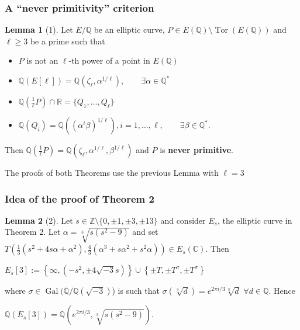 \documentclass[12pt,handout]{beamer} %
\newcommand{\Q}{\mathbb Q}
\newcommand{\Z}{\mathbb Z}
\newcommand{\F}{\mathbb F}
\newcommand{\C}{\mathbb C}
\newcommand{\R}{\mathbb R}
\theoremstyle{definition}
\newtheorem{Note}[theorem]{\translate{Note}}
\newtheorem{lem}{Lemma}
\begin{document}
\begin{frame}
 \frametitle{A ``never primitivity'' criterion}
  
 \begin{lem}[1]
 Let $E/\Q$ be an elliptic curve, $P\in E(\Q)\setminus\operatorname{Tor}(E(\Q))$ and $\ell\ge3$ be a prime such that
 \begin{itemize}
 \item $P$ is not an $\ell$-th power of a point in $E(\Q)$\medskip
  \item $\Q(E[\ell])=\Q(\zeta_\ell,\alpha^{1/\ell}),\qquad \exists \alpha\in\Q^*$\medskip
  \item $\Q(\frac1\ell P)\cap\R=\{Q_1,\ldots,Q_\ell\}$\medskip
  \item $\Q(Q_i)=\Q((\alpha^i\beta)^{1/\ell}), i=1,\ldots,\ell,\qquad \exists \beta\in\Q^*$.\medskip
 \end{itemize}
Then $\Q(\frac1\ell P)=\Q(\zeta_\ell,\alpha^{1/\ell},\beta^{1/\ell})$ and $P$ is \textbf{never primitive}.
 \end{lem}\pause
 
The proofs of both Theorems use the previous Lemma with $\ell=3$
 
 \frametitle{Idea of the proof of Theorem 2}

\begin{lem}[2] Let $s\in\Z\setminus\{0,\pm1,\pm3,\pm13\}$ and consider $E_s$, the elliptic curve in Theorem 2. Let $\alpha=\sqrt[3]{s(s^2-9)}$ and set
$\displaystyle T\left(\frac{1}{3}(s^2+4s\alpha+\alpha^2),\frac{4}{3}(\alpha^3+s\alpha^2+s^2\alpha)\right)\in E_s(\C).$\pause
 Then\\
\centerline{$\displaystyle{E_s[3]:=\left\{\infty,(-s^2,\pm4\sqrt{-3}s)\right\}
\cup\left\{\pm T,\pm T^\sigma, \pm T^\sigma\right\}}$}\pause

where $\sigma\in\operatorname{Gal}(\overline{\Q}/\Q(\sqrt{-3})$) is such that $\sigma(\sqrt[3]d)=e^{2\pi i/3}\sqrt[3]d$
 $\forall d\in\Q$. Hence\\
\centerline{$\displaystyle\Q(E_s[3])=\Q(e^{2\pi i/3},\sqrt[3]{s(s^2-9)}).$}
\end{lem}


\end{frame}
\end{document}
